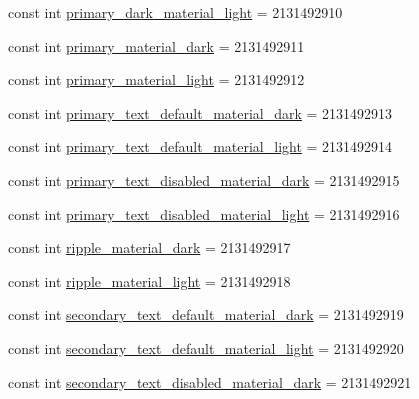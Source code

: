 \begin{DoxyCompactItemize}
const int \mbox{\hyperlink{class_f_w_p_s___app_1_1_droid_1_1_resource_1_1_color_aea411263b4fa9ceab0e0b60137d90e53}{primary\+\_\+dark\+\_\+material\+\_\+light}} = 2131492910
\item 
const int \mbox{\hyperlink{class_f_w_p_s___app_1_1_droid_1_1_resource_1_1_color_a0728afb8ad6c51f6783684f13c3577b7}{primary\+\_\+material\+\_\+dark}} = 2131492911
\item 
const int \mbox{\hyperlink{class_f_w_p_s___app_1_1_droid_1_1_resource_1_1_color_aa6a2d7bc0498030f8f61261b769ff0c9}{primary\+\_\+material\+\_\+light}} = 2131492912
\item 
const int \mbox{\hyperlink{class_f_w_p_s___app_1_1_droid_1_1_resource_1_1_color_a4e2573a670078bf3125adb24581ca995}{primary\+\_\+text\+\_\+default\+\_\+material\+\_\+dark}} = 2131492913
\item 
const int \mbox{\hyperlink{class_f_w_p_s___app_1_1_droid_1_1_resource_1_1_color_acbf25b67d507f5d461b52d67fb78ba7e}{primary\+\_\+text\+\_\+default\+\_\+material\+\_\+light}} = 2131492914
\item 
const int \mbox{\hyperlink{class_f_w_p_s___app_1_1_droid_1_1_resource_1_1_color_a83d0843757206a3e35127358a9bdf731}{primary\+\_\+text\+\_\+disabled\+\_\+material\+\_\+dark}} = 2131492915
\item 
const int \mbox{\hyperlink{class_f_w_p_s___app_1_1_droid_1_1_resource_1_1_color_abf30486f6d9d799d8db8b34bdfee0a61}{primary\+\_\+text\+\_\+disabled\+\_\+material\+\_\+light}} = 2131492916
\item 
const int \mbox{\hyperlink{class_f_w_p_s___app_1_1_droid_1_1_resource_1_1_color_a0a00f852844ea5a41c8c74b548db1f96}{ripple\+\_\+material\+\_\+dark}} = 2131492917
\item 
const int \mbox{\hyperlink{class_f_w_p_s___app_1_1_droid_1_1_resource_1_1_color_a90946ec80ff09144a192dee3f339e9e8}{ripple\+\_\+material\+\_\+light}} = 2131492918
\item 
const int \mbox{\hyperlink{class_f_w_p_s___app_1_1_droid_1_1_resource_1_1_color_a6ad0b223f776ce0644b8a806f210dca2}{secondary\+\_\+text\+\_\+default\+\_\+material\+\_\+dark}} = 2131492919
\item 
const int \mbox{\hyperlink{class_f_w_p_s___app_1_1_droid_1_1_resource_1_1_color_a671b36001afc3626d03be553549a3fda}{secondary\+\_\+text\+\_\+default\+\_\+material\+\_\+light}} = 2131492920
\item 
const int \mbox{\hyperlink{class_f_w_p_s___app_1_1_droid_1_1_resource_1_1_color_a1d021e1ea634f148dcd9c4732ba701dc}{secondary\+\_\+text\+\_\+disabled\+\_\+material\+\_\+dark}} = 2131492921

\end{DoxyCompactItemize}
